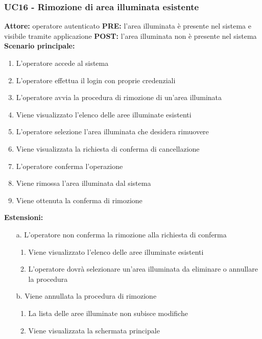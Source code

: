 \documentclass[a4paper, 12pt]{article}
\begin{document}
\subsubsection{UC16 - Rimozione di area illuminata esistente}
\textbf{Attore:} operatore autenticato\newline
\textbf{PRE:} l'area illuminata è presente nel sistema e visibile tramite applicazione\newline
\textbf{POST:} l'area illuminata non è presente nel sistema\newline
\textbf{Scenario principale:}
\begin{enumerate}
    \item L'operatore accede al sistema
    \item L'operatore effettua il login con proprie credenziali
    \item L'operatore avvia la procedura di rimozione di un'area illuminata
    \item Viene visualizzato l'elenco delle aree illuminate esistenti
    \item L'operatore selezione l'area illuminata che desidera rimuovere
    \item Viene visualizzata la richiesta di conferma di cancellazione
    \item L'operatore conferma l'operazione
    \item Viene rimossa l'area illuminata dal sistema
    \item Viene ottenuta la conferma di rimozione
\end{enumerate}
\textbf{Estensioni:}
\begin{itemize}
    \item [a.] L'operatore non conferma la rimozione alla richiesta di conferma
    \begin{enumerate}
        \item Viene visualizzato l'elenco delle aree illuminate esistenti
        \item L'operatore dovrà selezionare un'area illuminata da eliminare o annullare la procedura
    \end{enumerate}
    \item [b.] Viene annullata la procedura di rimozione
    \begin{enumerate}
        \item La lista delle aree illuminate non subisce modifiche
        \item Viene visualizzata la schermata principale
    \end{enumerate}
\end{itemize}
\end{document}
